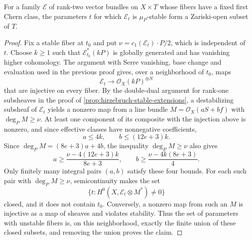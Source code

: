 \begin{lemma}\label{lem:hirzebruch-family-stability-open}
For a family $\mathcal E$ of rank-two vector bundles on $X\times T$ whose fibers have a fixed first Chern class, the parameters $t$ for which $\mathcal E_t$ is $\mu_P$-stable form a Zariski-open subset of $T$.
\end{lemma}
\begin{proof}
Fix a stable fiber at $t_0$ and put $\nu=c_1(\mathcal E_t)\cdot P/2$, which is independent of $t$. Choose $k\geq1$ such that $\mathcal E_{t_0}^*(kP)$ is globally generated and has vanishing higher cohomology. The argument with Serre vanishing, base change and evaluation used in the previous proof gives, over a neighborhood of $t_0$, maps
\[
 \mathcal E_t\longrightarrow\mathcal O_X(kP)^{\oplus N}
\]
that are injective on every fiber. By the double-dual argument for rank-one subsheaves in the proof of \cref{prop:hirzebruch-stable-extensions}, a destabilizing subsheaf of $\mathcal E_t$ yields a nonzero map from a line bundle $M=\mathcal O_X(aS+bf)$ with $\deg_P M\geq\nu$. At least one component of its composite with the injection above is nonzero, and since effective classes have nonnegative coefficients,
\[
 a\leq4k,\qquad b\leq(12e+3)k.
\]
Since $\deg_P M=(8e+3)a+4b$, the inequality $\deg_PM\geq\nu$ also gives
\[
 a\geq\frac{\nu-4(12e+3)k}{8e+3},
 \qquad b\geq\frac{\nu-4k(8e+3)}4.
\]
Only finitely many integral pairs $(a,b)$ satisfy these four bounds. For each such pair with $\deg_P M\geq\nu$, semicontinuity makes the set
\[
 \{t:H^0(X,\mathcal E_t\otimes M^*)\neq0\}
\]
closed, and it does not contain $t_0$. Conversely, a nonzero map from such an $M$ is injective as a map of sheaves and violates stability. Thus the set of parameters with unstable fibers is, on this neighborhood, exactly the finite union of these closed subsets, and removing the union proves the claim.
\end{proof}

